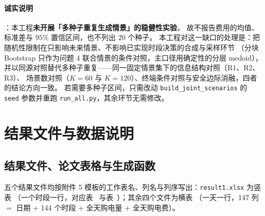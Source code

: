 \paragraph{诚实说明}：本工程\textbf{未开展「多种子重复生成情景」的稳健性实验}，
故不报告费用的均值、标准差与 $95\%$ 置信区间，也不列出 20 个种子。
本工程对这一缺口的处理是：把随机性限制在只影响未来情景、不影响已实现时段决策的合成与采样环节
（分块 Bootstrap 只作为问题 4 联合情景的条件对照，主口径用确定性的分层 medoid），
并以同源对照替代多种子重复——同一固定情景集下的信息结构对照（R1、R2、R3）、
场景数对照（$K=60$ 与 $K=120$）、终端条件对照与安全边际消融，四者的结论方向一致。
若需要多种子区间，只需改动 \texttt{build\_joint\_scenarios} 的 \texttt{seed} 参数并重跑
\texttt{run\_all.py}，其余环节无需修改。

\section{结果文件与数据说明}

\subsection{结果文件、论文表格与生成函数}\label{sec:app-filemap}

五个结果文件均按附件 5 模板的工作表名、列名与列序写出：\texttt{result1.xlsx} 为竖表
（一个时段一行，对应表~ 与表~）；其余四个文件为横表
（一天一行，147 列 $=$ 日期 $+$ 144 个时段 $+$ 全天购电量 $+$ 全天购电费）。

